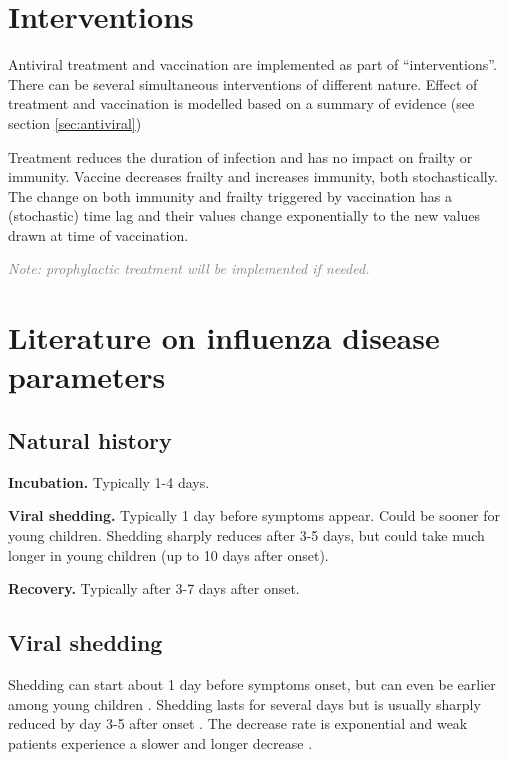 \documentclass[11pt, onecolumn]{article}
\newcommand{\note}[1]{\textit{\textcolor{Grey}{Note: #1}}}
\begin{document}
\section{Interventions}

Antiviral treatment and vaccination are implemented as part of ``interventions''. There can be several simultaneous interventions of different nature.
Effect of treatment and vaccination is modelled based on a summary of evidence (see section \ref{sec:antiviral})

Treatment reduces the duration of infection and has no impact on frailty or immunity. Vaccine decreases frailty and increases immunity, both stochastically. The change on both immunity and frailty triggered by vaccination has a (stochastic) time lag and their values change exponentially to the new values drawn at time of vaccination.

\note{prophylactic treatment will be implemented if needed.}





\section{Literature on influenza disease parameters}

\subsection{Natural history}

\textbf{Incubation.} Typically 1-4 days.

\textbf{Viral shedding.} Typically 1 day before symptoms appear. Could be sooner for young children. Shedding sharply reduces after 3-5 days, but could take much longer in young children (up to 10 days after onset). 

\textbf{Recovery.} Typically after 3-7 days after onset.


\subsection{Viral shedding}

Shedding can start about 1 day before symptoms onset, but can even be earlier among young children \cite{CDC:2011wq}. Shedding lasts for several days but is usually sharply reduced by day 3-5 after onset \cite{CDC:2011wq}. The decrease rate is exponential and weak patients experience a slower and longer decrease \cite{Lee:2009dc}.
\end{document}
